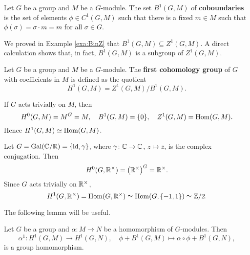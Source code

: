 \begin{definition}
    Let $G$ be a group and $M$ be a $G$-module. The set
    $B^1(G,M)$ of \textbf{coboundaries} is the set 
    of elements $\phi\in C^1(G,M)$ such that there is a fixed 
    $m\in M$ such that
    $\phi(\sigma)=\sigma\cdot m=m$ for all $\sigma\in G$.
\end{definition}

We proved in Example \ref{exa:BinZ} that  
$B^1(G,M)\subseteq Z^1(G,M)$. A direct calculation shows that, in fact, 
$B^1(G,M)$ is a subgroup of $Z^1(G,M)$. 

\begin{definition}
    Let $G$ be a group and $M$ be a $G$-module. The 
    \textbf{first cohomology group} of $G$ with coefficients
    in $M$ is defined as the quotient
    \[
    H^1(G,M)=Z^1(G,M)/B^1(G,M).
    \]
\end{definition}

\begin{example}
    If $G$ acts trivially on $M$, then 
    \[
    H^0(G,M)=M^G=M,
    \quad 
    B^1(G,M)=\{0\},
    \quad 
    Z^1(G,M)=\operatorname{Hom}(G,M).
    \]
    Hence 
    $H^1(G,M)\simeq\operatorname{Hom}(G,M)$.
\end{example}

\begin{example}
    Let $G=\operatorname{Gal}(\mathbb{C}/\mathbb{R})=\{\operatorname{id},\gamma\}$, where $\gamma\colon\mathbb{C}\to\mathbb{C}$, $z\mapsto\overline{z}$, is the complex conjugation. Then
    \[
    H^0(G,\mathbb{R}^\times)=\left(\mathbb{R}^\times\right)^G=\mathbb{R}^\times.
    \]
    Since $G$ acts trivially on $\mathbb{R}^\times$, 
    \[
    H^1(G,\mathbb{R}^\times)=\operatorname{Hom}(G,\mathbb{R}^\times)\simeq\operatorname{Hom}(G,\{-1,1\})\simeq\mathbb{Z}/2.
    \]
\end{example}

The following lemma will be useful. 

\begin{lemma}
\label{lem:H1_maps}
    Let $G$ be a group and 
    $\alpha\colon M\to N$ be a homomorphism of $G$-modules. 
    Then 
    \[
    \alpha^1\colon H^1(G,M)\to H^1(G,N),\quad 
    \phi+B^1(G,M)\mapsto \alpha\circ\phi+B^1(G,N),
    \]
    is a group homomorphism. 
\end{lemma}

